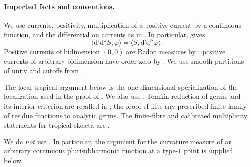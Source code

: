 
\paragraph{Imported facts and conventions.}
We use currents, positivity, multiplication of a positive current by a
continuous function, and the differential on currents as in
\cite[\S\S7.1--7.2, Example~7.2.12, and \S7.7]{CLD25}.  In particular,
\cite[Lemma~7.7.5]{CLD25} gives
\begin{equation}
\label{eq:p21p3-transpose-dd}
 \bigl\langle \mathrm d'\mathrm d''S,\varphi\bigr\rangle
 =
 \bigl\langle S,\mathrm d'\mathrm d''\varphi\bigr\rangle .
\end{equation}
Positive currents of bidimension $(0,0)$ are Radon measures by
\cite[Proposition~7.2.8]{CLD25}; positive currents of arbitrary
bidimension have order zero by \cite[Proposition~7.2.9]{CLD25}.  We use
smooth partitions of unity and cutoffs from
\cite[Corollaries~6.2.7--6.2.8]{CLD25}.

The local tropical argument below is the one-dimensional specialization
of the localization used in the proof of
\cite[Theorem~16.8.5]{CLD25}.  We also use
\cite[Proposition~3.3.6, Lemma~7.2.5, Lemma~12.3.6,
Theorem~12.2.4, Corollary~12.2.5,
\S14.3.2, Lemma~14.3.4, Proposition~14.4.2,
\S16.6, Proposition~16.6.3, and
\S\S18.2.5--18.2.8]{CLD25}.  Temkin reduction of germs and its interior
criterion are recalled in
\cite[\S6.13 and Theorem~6.15]{GJR26}; the proof of
\cite[Lemma~6.14]{GJR26} lifts any prescribed finite family of residue
functions to analytic germs.  The finite-fibre and calibrated
multiplicity statements for tropical skeleta are
\cite[Corollary~3.18, Remark~3.20, and Remark~4.2(7)]{GJR26}.

We do \emph{not} use \cite[Corollary~16.8.6]{CLD25}.  In particular, the
argument for the curvature measure of an arbitrary continuous
plurisubharmonic function at a type-$1$ point is supplied below.

